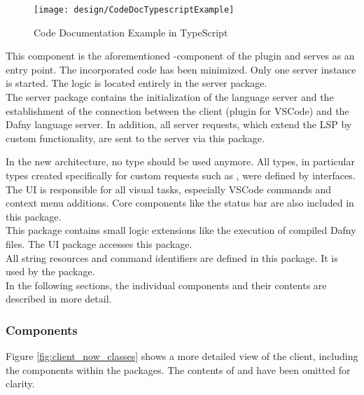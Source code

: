 \begin{figure}[H]
    \centering
    \texttt{[image: design/CodeDocTypescriptExample]}
    \caption{Code Documentation Example in TypeScript}
    \label{fig:CodeDocTypescriptExample}
\end{figure}

{\bf {}} \textendash{}
This component is the aforementioned -component of the plugin and serves as an entry point.
The incorporated code has been minimized.
Only one server instance is started.
The logic is located entirely in the server package.\\

{\bf {}} \textendash{}
The server package contains the initialization of the language server and the establishment of the connection between the client (plugin for VSCode) and the Dafny language server.
In addition, all server requests, which extend the LSP by custom functionality, are sent to the server via this package.\\

\pagebreak

{\bf {}} \textendash{}
In the new architecture, no  type should be used anymore.
All types, in particular types created specifically for custom requests such as , were defined by interfaces. \\

{\bf {}} \textendash{}
The UI is responsible for all visual tasks, especially VSCode commands and context menu additions.
Core components like the status bar are also included in this package.\\

{\bf {}} \textendash{}
This package contains small logic extensions like the execution of compiled Dafny files.
The UI package accesses this package.\\

{\bf {}} \textendash{}
All string resources and command identifiers are defined in this package.
It is used by the  package. \\

In the following sections, the individual components and their contents are described in more detail.

\subsubsection{Components}
Figure \ref{fig:client_now_classes} shows a more detailed view of the client, including the components within the packages.
The contents of  and  have been omitted for clarity.\\

